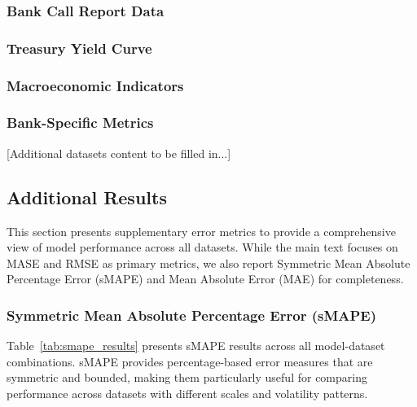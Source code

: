 \documentclass{article}
\begin{document}
\begin{appendices}

\subsubsection{Bank Call Report Data}

\subsubsection{Treasury Yield Curve}

\subsubsection{Macroeconomic Indicators}

\subsubsection{Bank-Specific Metrics}

[Additional datasets content to be filled in...]


\subsection{Additional Results}
\label{app:additional_results}

This section presents supplementary error metrics to provide a comprehensive view of model performance across all datasets. While the main text focuses on MASE and RMSE as primary metrics, we also report Symmetric Mean Absolute Percentage Error (sMAPE) and Mean Absolute Error (MAE) for completeness.

\subsubsection{Symmetric Mean Absolute Percentage Error (sMAPE)}

Table~\ref{tab:smape_results} presents sMAPE results across all model-dataset combinations. sMAPE provides percentage-based error measures that are symmetric and bounded, making them particularly useful for comparing performance across datasets with different scales and volatility patterns.




\end{appendices}
\end{document}
